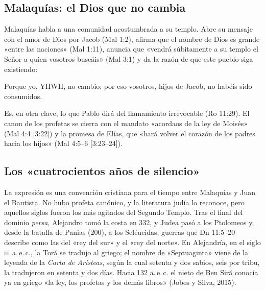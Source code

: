 \subsection{Malaquías: el Dios que no cambia}
Malaquías habla a una comunidad acostumbrada a su templo. Abre su mensaje con el amor de Dios por Jacob (Mal 1:2), afirma que el nombre de Dios es grande «entre las naciones» (Mal 1:11), anuncia que «vendrá súbitamente a su templo el Señor a quien vosotros buscáis» (Mal 3:1) y da la razón de que este pueblo siga existiendo:
\begin{cita}Porque yo, YHWH, no cambio; por eso vosotros, hijos de Jacob, no habéis sido consumidos.\end{cita}
Es, en otra clave, lo que Pablo dirá del llamamiento irrevocable (Ro 11:29). El canon de los profetas se cierra con el mandato «acordaos de la ley de Moisés» (Mal 4:4 [3:22]) y la promesa de Elías, que «hará volver el corazón de los padres hacia los hijos» (Mal 4:5--6 [3:23--24]).

\subsection{Los «cuatrocientos años de silencio»}
La expresión es una convención cristiana para el tiempo entre Malaquías y Juan el Bautista. No hubo profeta canónico, y la literatura judía lo reconoce, pero aquellos siglos fueron los más agitados del Segundo Templo. Tras el final del dominio \emph{persa}, Alejandro tomó la costa en 332, y Judea pasó a los Ptolomeos y, desde la batalla de Panias (200), a los Seléucidas, guerras que Dn 11:5--20 describe como las del «rey del sur» y el «rey del norte». En Alejandría, en el siglo \textsc{iii} a.\,e.\,c., la Torá se tradujo al griego; el nombre de «Septuaginta» viene de la leyenda de la \emph{Carta de Aristeas}, según la cual setenta y dos sabios, seis por tribu, la tradujeron en setenta y dos días. Hacia 132 a.\,e.\,c. el nieto de Ben Sirá conocía ya en griego «la ley, los profetas y los demás libros» (Jobes y Silva, 2015).

